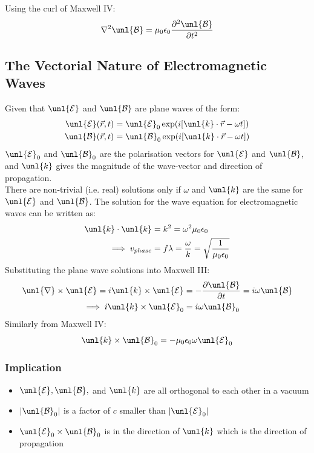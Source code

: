 \documentclass[a4paper, 11pt, normalem]{report}
\newcommand\p{\partial}
\newcommand\E{\mathcal{E}}
\newcommand\uE{\unl{\E}}
\newcommand\B{\mathcal{B}}
\newcommand\uB{\unl{\B}}
\newcommand\del{\unl{\nabla}}
\newcommand\eno{\epsilon_0}
\newcommand\vk{\unl{k}}
\newcommand\lam{\lambda}
\begin{document}
\chapter{}
Using the curl of Maxwell \RN{4}:
\begin{equation}
    \nabla^2\uB = \mu_0\eno\frac{\p^2\uB}{\p t^2}
\end{equation}

\section{The Vectorial Nature of Electromagnetic Waves}
Given that $\uE$ and $\uB$ are plane waves of the form:
\begin{align}
    \uE(\vec{r},t) &= \uE_0\exp(i[\vk\cdot\vec{r}-\omega t]) \\
    \uB(\vec{r},t) &= \uB_0\exp(i[\vk\cdot\vec{r}-\omega t])
\end{align}
$\uE_0$ and $\uB_0$ are the polarisation vectors for $\uE$ and $\uB$, and $\vk$ gives the magnitude of the wave-vector and direction of propagation. \\
There are non-trivial (i.e. real) solutions only if $\omega$ and $\vk$ are the same for $\uE$ and $\uB$.
The solution for the wave equation for electromagnetic waves can be written as:
\begin{align}
    \vk\cdot\vk &= k^2 = \omega^2\mu_0\eno \\
    \implies v_{phase} &= f\lam = \frac{\omega}{k} = \sqrt{\frac{1}{\mu_0\eno}}
\end{align}
Substituting the plane wave solutions into Maxwell \RN{3}:
\begin{align}
    \del \times \uE = i\vk \times \uE &= -\frac{\p\uB}{\p t} = i\omega\uB \\
    \implies i\vk\times\uE_0 &= i\omega\uB_0
\end{align}
Similarly from Maxwell \RN{4}:
\begin{equation}
    \vk \times \uB_0 = -\mu_0\eno\omega\uE_0
\end{equation}

\subsection{Implication}
\begin{itemize}
    \item $\uE, \uB,$ and $\vk$ are all orthogonal to each other in a vacuum
    \item $|\uB_0|$ is a factor of $c$ smaller than $|\uE_0|$
    \item $\uE_0\times\uB_0$ is in the direction of $\vk$ which is the direction of propagation
\end{itemize}
\end{document}
